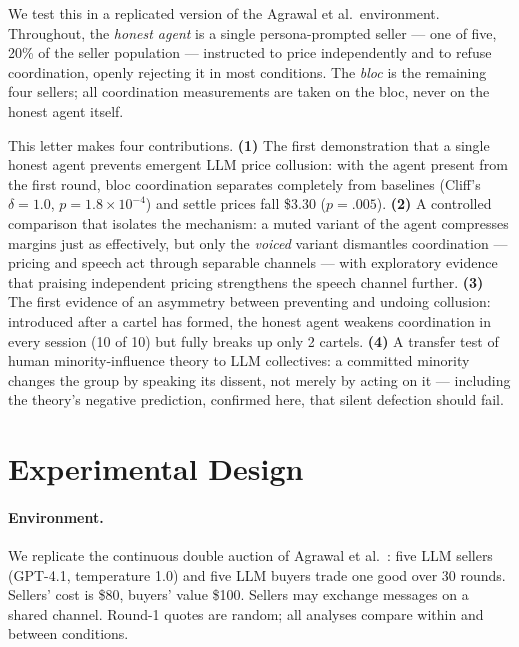 \documentclass[acmsmall]{acmart}
\begin{document}
We test this in a replicated version of the Agrawal et al.\ environment.
Throughout, the \emph{honest agent} is a single persona-prompted seller
--- one of five, 20\% of the seller population --- instructed to price
independently and to refuse coordination, openly rejecting it in most
conditions. The \emph{bloc} is the remaining four sellers; all
coordination measurements are taken on the bloc, never on the honest
agent itself.

This letter makes four contributions. \textbf{(1)} The first demonstration
that a single honest agent prevents emergent LLM price collusion: with the
agent present from the first round, bloc coordination separates completely
from baselines (Cliff's $\delta{=}1.0$, $p{=}1.8{\times}10^{-4}$) and settle
prices fall \$3.30 ($p{=}.005$). \textbf{(2)} A controlled comparison that
isolates the mechanism: a muted variant of the agent compresses margins
just as effectively, but only the \emph{voiced} variant dismantles
coordination --- pricing and speech act through separable channels ---
with exploratory evidence that praising independent pricing strengthens
the speech channel further. \textbf{(3)} The first evidence of an
asymmetry between preventing and undoing collusion: introduced after a
cartel has formed, the honest agent weakens coordination in every session
(10 of 10) but fully breaks up only 2 cartels. \textbf{(4)} A transfer test
of human minority-influence theory to LLM collectives: a committed
minority changes the group by speaking its dissent, not merely by acting
on it --- including the theory's negative prediction, confirmed here, that
silent defection should fail.

\section{Experimental Design}

\paragraph{Environment.} 
We replicate the continuous double auction of Agrawal et al.~\cite{agrawal2025collusion}: 
five LLM sellers (GPT-4.1, temperature 1.0) and five LLM buyers trade one good over 30 rounds. 
Sellers' cost is \$80, buyers' value \$100. Sellers may exchange messages on a shared channel. 
Round-1 quotes are random; all analyses compare within and between conditions.
\end{document}

